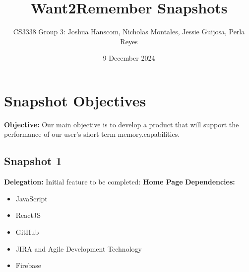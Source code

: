 \documentclass{article}
\title{Want2Remember Snapshots}
\author{CS3338 Group 3: Joshua Hanscom, Nicholas Montales, Jessie Guijosa, Perla Reyes}
\date{9 December 2024}
\begin{document}
\maketitle

\newpage

\section{Snapshot Objectives}
\textbf{Objective:} Our main objective is to develop a product that will support the performance of our user's short-term memory.capabilities.\newline
\subsection{Snapshot 1}
\textbf{Delegation:} Initial feature to be completed: \textbf{Home Page}\newline
\textbf{Dependencies:}
\begin{itemize}
    \item JavaScript
    \item ReactJS
    \item GitHub
    \item JIRA and Agile Development Technology
    \item Firebase
\end{itemize}
\end{document}
